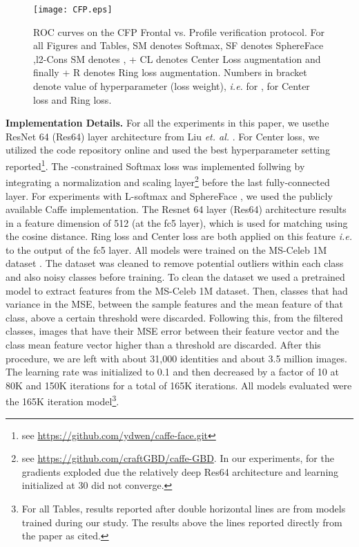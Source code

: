 \documentclass[10pt,twocolumn,letterpaper]{article}
\begin{document}
\begin{figure}\centering
            \texttt{[image: CFP.eps]}


\vspace{-0.2cm}
\caption{ ROC curves on the CFP Frontal vs. Profile verification protocol. For all Figures and Tables, SM denotes Softmax, SF denotes SphereFace \cite{liu2017sphereface},l2-Cons SM denotes \cite{ranjan2017l2}, + CL denotes Center Loss augmentation \cite{wen2016discriminative} and finally + R denotes Ring loss augmentation. Numbers in bracket denote value of hyperparameter (loss weight), \emph{i.e.}  for \cite{ranjan2017l2},  for Center loss and Ring loss.}
\label{fig_cfp}
\vspace{-0.5cm}
\end{figure}




\textbf{Implementation Details.}
For all the experiments in this paper, we usethe ResNet 64 (Res64) layer architecture from Liu \emph{et. al.} \cite{liu2017sphereface}. For Center loss, we utilized the code repository online and used the best hyperparameter setting reported\footnote{see \url{https://github.com/ydwen/caffe-face.git}}. The -constrained Softmax loss was implemented follwing \cite{ranjan2017l2}  by integrating a normalization and scaling layer\footnote{see \url{https://github.com/craftGBD/caffe-GBD}. In our experiments, for  the gradients exploded due the relatively deep Res64 architecture and learning  initialized at 30 did not converge.} before the last fully-connected layer. For experiments with L-softmax \cite{liu2016large} and SphereFace \cite{liu2017sphereface}, we used the publicly available Caffe implementation. The Resnet 64 layer (Res64) architecture results in a feature dimension of 512 (at the fc5 layer), which is used for  matching using the cosine distance. Ring loss and Center loss are both applied on this feature \emph{i.e.} to the output of the fc5 layer.  All models were trained on the MS-Celeb 1M dataset \cite{guo2016ms}. The dataset was cleaned to remove potential outliers within each class and also noisy classes before training. To clean the dataset we used a pretrained model to  extract features from the MS-Celeb 1M dataset. Then, classes that had variance in the MSE, between the sample features and the mean feature of that class, above a certain threshold were discarded. Following this, from the filtered classes, images that have their MSE error between their feature vector and the class mean feature vector higher than a threshold are discarded. After this procedure, we are left with about 31,000 identities and about 3.5 million images. The learning rate was initialized to 0.1 and then decreased by a factor of 10 at 80K and 150K iterations for a total of 165K iterations. All models evaluated were the 165K iteration model\footnote{For all Tables, results reported after double horizontal lines are from models trained during our study. The results above the lines reported directly from the paper as cited.}.
\end{document}

